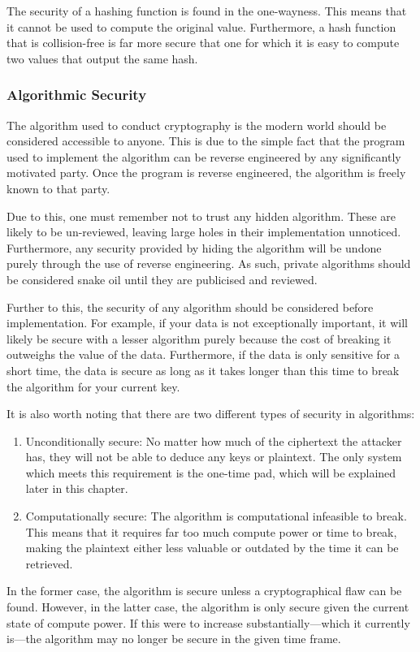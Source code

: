 				The security of a hashing function is found in the one-wayness.
				This means that it cannot be used to compute the original value.
				Furthermore, a hash function that is collision-free is far more secure that one for which it is easy to compute two values that output the same hash.

			\subsubsection{Algorithmic Security}
				The algorithm used to conduct cryptography is the modern world should be considered accessible to anyone.
				This is due to the simple fact that the program used to implement the algorithm can be reverse engineered by any significantly motivated party.
				Once the program is reverse engineered, the algorithm is freely known to that party.

				Due to this, one must remember not to trust any hidden algorithm.
				These are likely to be un-reviewed, leaving large holes in their implementation unnoticed.
				Furthermore, any security provided by hiding the algorithm will be undone purely through the use of reverse engineering.
				As such, private algorithms should be considered snake oil until they are publicised and reviewed.

				Further to this, the security of any algorithm should be considered before implementation.
				For example, if your data is not exceptionally important, it will likely be secure with a lesser algorithm purely because the cost of breaking it outweighs the value of the data.
				Furthermore, if the data is only sensitive for a short time, the data is secure as long as it takes longer than this time to break the algorithm for your current key.

				It is also worth noting that there are two different types of security in algorithms:
				\begin{enumerate}
					\item Unconditionally secure: No matter how much of the ciphertext the attacker has, they will not be able to deduce any keys or plaintext.
						The only system which meets this requirement is the one-time pad, which will be explained later in this chapter.
					\item Computationally secure: The algorithm is computational infeasible to break.
						This means that it requires far too much compute power or time to break, making the plaintext either less valuable or outdated by the time it can be retrieved.
				\end{enumerate}
				In the former case, the algorithm is secure unless a cryptographical flaw can be found.
				However, in the latter case, the algorithm is only secure given the current state of compute power.
				If this were to increase substantially---which it currently is---the algorithm may no longer be secure in the given time frame.

